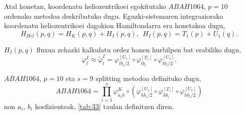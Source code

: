 Atal honetan, koordenatu heliozentrikoei egokitutako $ABAH1064$, $p=10$ ordenako metodoa deskribatuko dugu.  
Eguzki-sistemaren integraziorako koordenatu heliozentrikoei dagokion Hamiltondarra era honetakoa dugu,
\begin{equation*}
H_{Hel}(p,q)=H_K(p,q)+H_I(p,q), \ \ H_I(p,q)=T_1(p)+U_1(q). 
\end{equation*}

$H_I(p,q)$ fluxua zehazki kalkulatu ordez honen hurbilpen bat erabiliko dugu,
\begin{equation*}
\varphi_t^I \approx \tilde{\varphi}_t^I= \varphi_{{tb_i}/{2}}^{[U_1]} \circ \varphi_{tb_i}^{[T_1]} \circ \varphi_{{tb_i}/{2}}^{[U_1]}.
\end{equation*}

$ABAH1064$, $p=10$ eta $s=9$ splitting metodoa definituko dugu,
\begin{equation*}
ABAH1064=\prod\limits_{i=1}^{s} \varphi_{a_ih}^K \circ (\varphi_{{hb_i}/{2}}^{[U_1]} \circ \varphi_{hb_i}^{[T_1]} \circ \varphi_{{hb_i}/{2}}^{[U_1]})
\end{equation*}
non $a_i$, $b_i$ koefizienteak, \ref{tab:33} taulan definitzen diren.  

\begin{table}
\centering
\caption[$ABAH1064$ splitting metodoa.] 
{\small{$ABAH1064$ splitting metodoa \cite{Blanes2013}.}}
\label{tab:33}       %
\centering
{}
\end{table}




